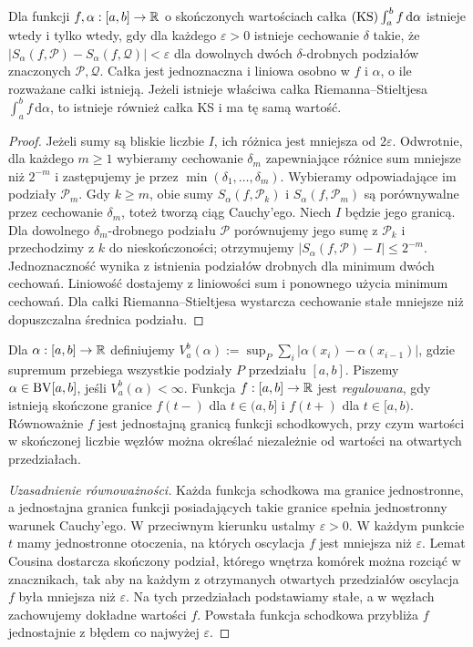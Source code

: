\begin{twierdzenie}
\label{tw:ks-cauchy}
Dla funkcji $f,\alpha:[a,b]\to\mathbb R$ o skończonych wartościach całka $(\mathrm{KS})\int_a^b f\,\mathrm d\alpha$ istnieje wtedy i tylko wtedy, gdy dla każdego $\varepsilon>0$ istnieje cechowanie $\delta$ takie, że
$|S_\alpha(f,\mathcal P)-S_\alpha(f,\mathcal Q)|<\varepsilon$ dla dowolnych dwóch $\delta$-drobnych podziałów znaczonych $\mathcal P,\mathcal Q$. Całka jest jednoznaczna i liniowa osobno w $f$ i $\alpha$, o ile rozważane całki istnieją. Jeżeli istnieje właściwa całka Riemanna--Stieltjesa $\int_a^b f\,\mathrm d\alpha$, to istnieje również całka KS i ma tę samą wartość.
\end{twierdzenie}
\begin{proof}
Jeżeli sumy są bliskie liczbie $I$, ich różnica jest mniejsza od $2\varepsilon$. Odwrotnie, dla każdego $m\ge1$ wybieramy cechowanie $\delta_m$ zapewniające różnice sum mniejsze niż $2^{-m}$ i zastępujemy je przez $\min(\delta_1,\ldots,\delta_m)$. Wybieramy odpowiadające im podziały $\mathcal P_m$. Gdy $k\ge m$, obie sumy $S_\alpha(f,\mathcal P_k)$ i $S_\alpha(f,\mathcal P_m)$ są porównywalne przez cechowanie $\delta_m$, toteż tworzą ciąg Cauchy'ego. Niech $I$ będzie jego granicą. Dla dowolnego $\delta_m$-drobnego podziału $\mathcal P$ porównujemy jego sumę z $\mathcal P_k$ i przechodzimy z $k$ do nieskończoności; otrzymujemy $|S_\alpha(f,\mathcal P)-I|\le2^{-m}$. Jednoznaczność wynika z istnienia podziałów drobnych dla minimum dwóch cechowań. Liniowość dostajemy z liniowości sum i ponownego użycia minimum cechowań. Dla całki Riemanna--Stieltjesa wystarcza cechowanie stałe mniejsze niż dopuszczalna średnica podziału.
\end{proof}

\begin{definicja}
Dla $\alpha:[a,b]\to\mathbb R$ definiujemy $V_a^b(\alpha):=\sup_P\sum_i|\alpha(x_i)-\alpha(x_{i-1})|$, gdzie supremum przebiega wszystkie podziały $P$ przedziału $[a,b]$. Piszemy $\alpha\in\mathrm{BV}[a,b]$, jeśli $V_a^b(\alpha)<\infty$. Funkcja $f:[a,b]\to\mathbb R$ jest \emph{regulowana}, gdy istnieją skończone granice $f(t-)$ dla $t\in(a,b]$ i $f(t+)$ dla $t\in[a,b)$. Równoważnie $f$ jest jednostajną granicą funkcji schodkowych, przy czym wartości w skończonej liczbie węzłów można określać niezależnie od wartości na otwartych przedziałach.
\end{definicja}
\begin{proof}[Uzasadnienie równoważności]
Każda funkcja schodkowa ma granice jednostronne, a jednostajna granica funkcji posiadających takie granice spełnia jednostronny warunek Cauchy'ego. W przeciwnym kierunku ustalmy $\varepsilon>0$. W każdym punkcie $t$ mamy jednostronne otoczenia, na których oscylacja $f$ jest mniejsza niż $\varepsilon$. Lemat Cousina dostarcza skończony podział, którego wnętrza komórek można rozciąć w znacznikach, tak aby na każdym z otrzymanych otwartych przedziałów oscylacja $f$ była mniejsza niż $\varepsilon$. Na tych przedziałach podstawiamy stałe, a w węzłach zachowujemy dokładne wartości $f$. Powstała funkcja schodkowa przybliża $f$ jednostajnie z błędem co najwyżej $\varepsilon$.
\end{proof}

